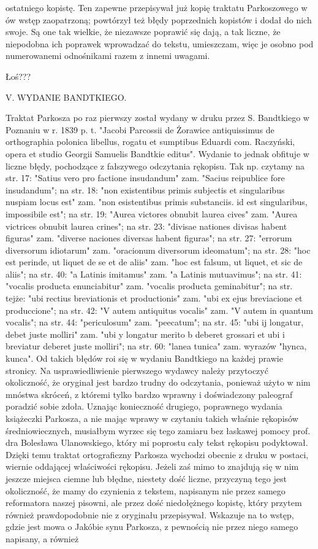 ostatniego kopistę. Ten zapewne przepisywał już kopię traktatu Parkoszowego w ów wstęp zaopatrzoną; powtórzył też błędy poprzednich kopistów i dodał do nich swoje. Są one tak wielkie, że niezawsze poprawić się dają, a tak liczne, że niepodobna ich poprawek wprowadzać do tekstu, umieszczam, więc je osobno pod numerowanemi odnośnikami razem z innemi uwagami.

Łoś???

V. WYDANIE BANDTKIEGO.

 

Traktat Parkosza po raz pierwszy został wydany w druku przez S. Bandtkiego w Poznaniu w r. 1839 p. t. "Jacobi Parcossii de Żorawice antiquissimus de orthographia polonica libellus, rogatu et sumptibus Eduardi com. Raczyński, opera et studio Georgii Samuelis Bandtkie editus". Wydanie to jednak obfituje w liczne błędy, pochodzące z fałszywego odczytania rękopisu. Tak np. czytamy na str. 17: "Satius vero pro factione insudandum" zam. "Sacius reipublice fore insudandum"; na str. 18: "non existentibus primis subjectis et singularibus nuspiam locus est" zam. "non esistentibus primis substanciis. id est singularibus, impossibile est"; na str. 19: "Aurea victores obnubit laurea cives" zam. "Aurea victrices obnubit laurea crines"; na str. 23: "divisae nationes divisas habent figuras" zam. "diverse naciones diversas habent figuras"; na str. 27: "errorum diversorum idiotarum" zam. "oracionum diversorum ideomatum"; na str. 28: "hoc est perinde, ut liquet de se et de aliis" zam. "hoc est falsum, ut liquet, et sic de aliis"; na str. 40: "a Latinis imitamus" zam. "a Latinis mutuavimus"; na str. 41: "vocalis producta enunciabitur" zam. "vocalis producta geminabitur"; na str. tejże: "ubi rectius breviationis et productionis" zam. "ubi ex ejus breviacione et produccione"; na str. 42: "V autem antiquitus vocalis" zam. "V autem in quantum vocalis"; na str. 44: "periculosum" zam. "peecatum"; na str. 45: "ubi ij longatur, debet juste molliri" zam. "ubi y longatur merito b deberet grossari et ubi i breviatur deberet juste molliri"; na str. 60: "lanea tunica" zam. wyrazów "hynca, kunca". Od takich błędów roi się w wydaniu Bandtkiego na każdej prawie stronicy. Na usprawiedliwienie pierwszego wydawcy należy przytoczyć okoliczność, że oryginał jest bardzo trudny do odczytania, ponieważ użyto w nim mnóstwa skróceń, z któremi tylko bardzo wprawny i doświadczony paleograf poradzić sobie zdoła. Uznając konieczność drugiego, poprawnego wydania książeczki Parkosza, a nie mając wprawy w czytaniu takich właśnie rękopisów średniowiecznych, musiałbym wyrzec się tego zamiaru bez łaskawej pomocy prof. dra Bolesława Ulanowskiego, który mi poprostu cały tekst rękopisu podyktował. Dzięki temu traktat ortograficzny Parkosza wychodzi obecnie z druku w postaci, wiernie oddającej właściwości rękopisu. Jeżeli zaś mimo to znajdują się w nim jeszcze miejsca ciemne lub błędne, niestety dość liczne, przyczyną tego jest okoliczność, że mamy do czynienia z tekstem, napisanym nie przez samego reformatora naszej pisowni, ale przez dość niedołężnego kopistę, który przytem również prawdopodobnie nie z oryginału przepisywał. Wskazuje na to wstęp, gdzie jest mowa o Jakóbie synu Parkosza, z pewnością nie przez niego samego napisany, a również 